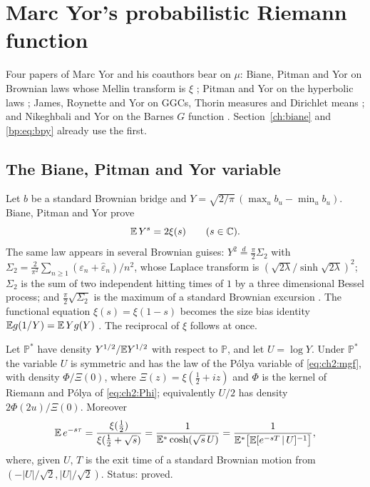 \section{Marc Yor's probabilistic Riemann function}\label{ht:sec:yor}

Four papers of Marc Yor and his coauthors bear on $\mu$: Biane, Pitman and Yor on Brownian laws whose Mellin transform is $\xi$ \cite{BPY01}; Pitman and Yor on the hyperbolic laws \cite{PitmanYor03}; James, Roynette and Yor on GGCs, Thorin measures and Dirichlet means \cite{JRY}; and Nikeghbali and Yor on the Barnes $G$ function \cite{NY09}. Section~\ref{ch:biane} and \eqref{bp:eq:bpy} already use the first.

\subsection{The Biane, Pitman and Yor variable}
Let $b$ be a standard Brownian bridge and $Y=\sqrt{2/\pi}\,(\max_ub_u-\min_ub_u)$. Biane, Pitman and Yor prove \cite[(4), (5)]{BPY01} %
\[
\mathbb{E}\,Y^s=2\xi(s)\qquad(s\in\mathbb C).
\]
The same law appears in several Brownian guises: $Y^2\overset{d}{=}\frac\pi2\Sigma_2$ with $\Sigma_2=\frac2{\pi^2}\sum_{n\ge1}(\varepsilon_n+\hat\varepsilon_n)/n^2$, whose Laplace transform is $(\sqrt{2\lambda}/\sinh\sqrt{2\lambda})^2$; $\Sigma_2$ is the sum of two independent hitting times of $1$ by a three dimensional Bessel process; and $\frac\pi2\sqrt{\Sigma_2}$ is the maximum of a standard Brownian excursion \cite[(57)]{BPY01}. %
The functional equation $\xi(s)=\xi(1-s)$ becomes the size bias identity $\mathbb{E} g(1/Y)=\mathbb{E}\,Y g(Y)$ \cite[(20)]{BPY01}. %
The reciprocal of $\xi$ follows at once.

\begin{proposition}\label{ht:prop:bpy}
Let $\mathbb P^*$ have density $Y^{1/2}/\mathbb{E} Y^{1/2}$ with respect to $\mathbb P$, and let $U=\log Y$. Under $\mathbb P^*$ the variable $U$ is symmetric and has the law of the P\'olya variable of \eqref{eq:ch2:mgf}, with density $\Phi/\Xi(0)$, where $\Xi(z)=\xi(\frac12+iz)$ and $\Phi$ is the kernel of Riemann and P\'olya of \eqref{eq:ch2:Phi}; equivalently $U/2$ has density $2\Phi(2u)/\Xi(0)$. Moreover
\[
\mathbb{E}\,e^{-s\tau}=\frac{\xi(\frac12)}{\xi(\frac12+\sqrt s)}=\frac1{\mathbb{E}^*\cosh(\sqrt s\,U)}=\frac1{\mathbb{E}^*\big[\mathbb{E}[e^{-sT}\,|\,U]^{-1}\big]},
\]
where, given $U$, $T$ is the exit time of a standard Brownian motion from $(-|U|/\sqrt2,|U|/\sqrt2)$. Status: proved.
\end{proposition}

